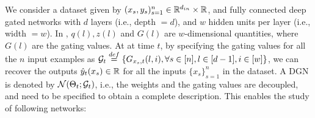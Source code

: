 \begin{table}[!htb]
\begin{minipage}{0.5\columnwidth}
\end{minipage}
\begin{minipage}{0.5\columnwidth}
\end{minipage}
\caption{Here $\Theta(l,i,j)$ denotes the weight connecting node $i$ of layer $l-1$ to node $j$ of layer $l$, and $\odot$ stands for the \emph{Hadamard} product. The left table shows a DGN, and the right table shows a gating network. }
\label{tb:dgn}
\end{table}
We consider a dataset given by $(x_s,y_s)_{s=1}^n\in \mathbb{R}^{d_{in}}\times \mathbb{R}$, and fully connected deep gated networks with $d$ layers (i.e., depth $=d$), and $w$ hidden units per layer (i.e., width $=w$). In , $q(l),z(l)$ and $G(l)$ are $w$-dimensional quantities, where $G(l)$ are the gating values.  At at time $t$, by specifying the gating values for all the $n$ input examples as $\mathcal{G}_t\stackrel{def}=\{G_{x_{s},t}(l,i), \forall s\in[n],l\in[d-1],i\in[w]\}$, we can recover the outputs $\hat{y}_t(x_s)\in \mathbb{R}$ for all the inputs $\{x_s\}_{s=1}^n$ in the dataset.  A DGN is denoted by $\mathcal{N}(\Theta_t;\mathcal{G}_t)$, i.e., the weights and the gating values are decoupled, and need to be specified to obtain a complete description. This enables the study of following networks:\\
